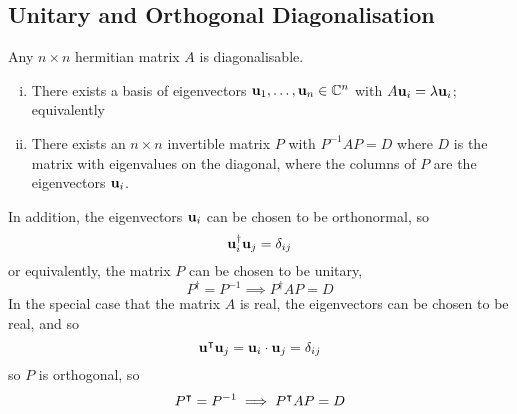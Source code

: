 \subsection{Unitary and Orthogonal Diagonalisation}
\begin{theorem}
	Any \(n\times n\) hermitian matrix \(A\) is diagonalisable.
	\begin{enumerate}[(i)]
		\item There exists a basis of eigenvectors \(\vb u_1, \dots, \vb u_n \in \mathbb C^n\) with \(A\vb u_i = \lambda \vb u_i\); equivalently
		\item There exists an \(n \times n\) invertible matrix \(P\) with \(P^{-1}AP = D\) where \(D\) is the matrix with eigenvalues on the diagonal, where the columns of \(P\) are the eigenvectors \(\vb u_i\).
	\end{enumerate}
	In addition, the eigenvectors \(\vb u_i\) can be chosen to be orthonormal, so
	\[
		\vb u^\dagger_i \vb u_j = \delta_{ij}
	\]
	or equivalently, the matrix \(P\) can be chosen to be unitary,
	\[
		P^\dagger = P^{-1} \implies P^\dagger AP = D
	\]
	In the special case that the matrix \(A\) is real, the eigenvectors can be chosen to be real, and so
	\[
		\vb u^\intercal \vb u_j = \vb u_i \cdot \vb u_j = \delta_{ij}
	\]
	so \(P\) is orthogonal, so
	\[
		P^\intercal = P^{-1} \implies P^\intercal AP = D
	\]
\end{theorem}
